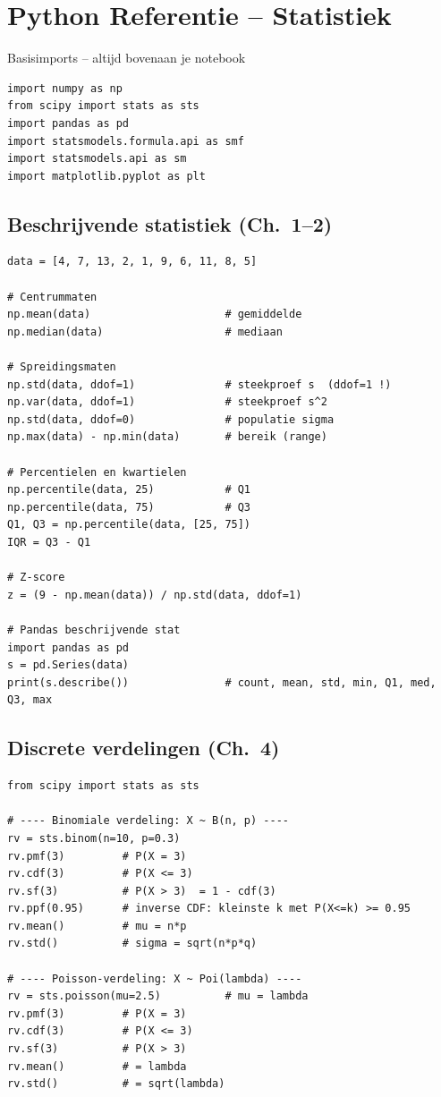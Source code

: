 \documentclass[a4paper,11pt]{article}
\begin{document}
\newpage
\section{Python Referentie -- Statistiek}
\label{sec:python}

\begin{conceptbox}{Basisimports -- altijd bovenaan je notebook}
\begin{verbatim}
import numpy as np
from scipy import stats as sts
import pandas as pd
import statsmodels.formula.api as smf
import statsmodels.api as sm
import matplotlib.pyplot as plt
\end{verbatim}
\end{conceptbox}

\subsection{Beschrijvende statistiek (Ch.\ 1--2)}

\begin{verbatim}
data = [4, 7, 13, 2, 1, 9, 6, 11, 8, 5]

# Centrummaten
np.mean(data)                     # gemiddelde
np.median(data)                   # mediaan

# Spreidingsmaten
np.std(data, ddof=1)              # steekproef s  (ddof=1 !)
np.var(data, ddof=1)              # steekproef s^2
np.std(data, ddof=0)              # populatie sigma
np.max(data) - np.min(data)       # bereik (range)

# Percentielen en kwartielen
np.percentile(data, 25)           # Q1
np.percentile(data, 75)           # Q3
Q1, Q3 = np.percentile(data, [25, 75])
IQR = Q3 - Q1

# Z-score
z = (9 - np.mean(data)) / np.std(data, ddof=1)

# Pandas beschrijvende stat
import pandas as pd
s = pd.Series(data)
print(s.describe())               # count, mean, std, min, Q1, med, Q3, max
\end{verbatim}

\subsection{Discrete verdelingen (Ch.\ 4)}

\begin{verbatim}
from scipy import stats as sts

# ---- Binomiale verdeling: X ~ B(n, p) ----
rv = sts.binom(n=10, p=0.3)
rv.pmf(3)         # P(X = 3)
rv.cdf(3)         # P(X <= 3)
rv.sf(3)          # P(X > 3)  = 1 - cdf(3)
rv.ppf(0.95)      # inverse CDF: kleinste k met P(X<=k) >= 0.95
rv.mean()         # mu = n*p
rv.std()          # sigma = sqrt(n*p*q)

# ---- Poisson-verdeling: X ~ Poi(lambda) ----
rv = sts.poisson(mu=2.5)          # mu = lambda
rv.pmf(3)         # P(X = 3)
rv.cdf(3)         # P(X <= 3)
rv.sf(3)          # P(X > 3)
rv.mean()         # = lambda
rv.std()          # = sqrt(lambda)
\end{verbatim}
\end{document}
